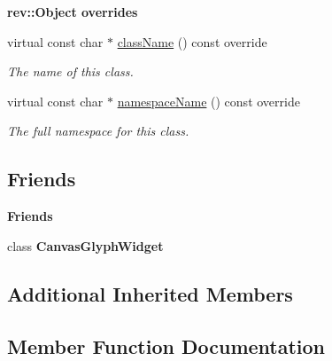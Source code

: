 \begin{Indent}\textbf{ rev\+::Object overrides}\par
\begin{DoxyCompactItemize}
\item 
virtual const char $\ast$ \mbox{\hyperlink{classrev_1_1_view_1_1_glyph_item_aeae051c75cc6ac7cccf256041721e840}{class\+Name}} () const override
\begin{DoxyCompactList}\small\item\em The name of this class. \end{DoxyCompactList}\item 
virtual const char $\ast$ \mbox{\hyperlink{classrev_1_1_view_1_1_glyph_item_a8fa3b57d04a71e8d5f9eb7593c7d2f0f}{namespace\+Name}} () const override
\begin{DoxyCompactList}\small\item\em The full namespace for this class. \end{DoxyCompactList}\end{DoxyCompactItemize}
\end{Indent}
\subsection*{Friends}
\begin{Indent}\textbf{ Friends}\par
\begin{DoxyCompactItemize}
\item 
\mbox{\label{classrev_1_1_view_1_1_glyph_item_a94f2d9343147cb7748698bd8a3b0a89b}} 
class {\bfseries Canvas\+Glyph\+Widget}
\end{DoxyCompactItemize}
\end{Indent}
\subsection*{Additional Inherited Members}


\subsection{Member Function Documentation}
\mbox{\label{classrev_1_1_view_1_1_glyph_item_aeae051c75cc6ac7cccf256041721e840}} 
